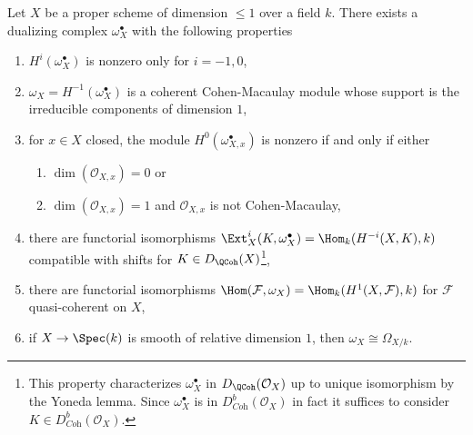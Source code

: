 \begin{lemma}
\label{lemma-duality-dim-1}
Let $X$ be a proper scheme of dimension $\leq 1$ over a field $k$.
There exists a dualizing complex $\omega_X^\bullet$ with the
following properties
\begin{enumerate}
\item $H^i(\omega_X^\bullet)$ is nonzero only for $i = -1, 0$,
\item $\omega_X = H^{-1}(\omega_X^\bullet)$
is a coherent Cohen-Macaulay module whose support is the
irreducible components of dimension $1$,
\item for $x \in X$ closed, the module $H^0(\omega_{X, x}^\bullet)$
is nonzero if and only if either
\begin{enumerate}
\item $\dim(\mathcal{O}_{X, x}) = 0$ or
\item $\dim(\mathcal{O}_{X, x}) = 1$
and $\mathcal{O}_{X, x}$ is not Cohen-Macaulay,
\end{enumerate}
\item there are functorial isomorphisms
$\Ext^i_X(K, \omega_X^\bullet) = \Hom_k(H^{-i}(X, K), k)$
compatible with shifts for $K \in D_\QCoh(X)$\footnote{This property
characterizes $\omega_X^\bullet$ in $D_\QCoh(\mathcal{O}_X)$
up to unique isomorphism by the Yoneda lemma. Since $\omega_X^\bullet$
is in $D^b_{\textit{Coh}}(\mathcal{O}_X)$ in fact it suffices to consider
$K \in D^b_{\textit{Coh}}(\mathcal{O}_X)$.},
\item there are functorial isomorphisms
$\Hom(\mathcal{F}, \omega_X) = \Hom_k(H^1(X, \mathcal{F}), k)$
for $\mathcal{F}$ quasi-coherent on $X$,
\item if $X \to \Spec(k)$ is smooth of relative dimension $1$,
then $\omega_X \cong \Omega_{X/k}$.
\end{enumerate}
\end{lemma}

